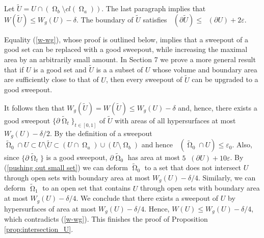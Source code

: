 \documentclass[12pt]{amsart}
\DeclareMathOperator{\Hn}{\mathcal{H}^n}
\DeclareMathOperator{\Hnn}{\mathcal{H}^{n+1}}
\DeclareMathOperator{\Om}{\Omega}
\newcommand{\Cgs}{5 \Hn(\partial U)}
\theoremstyle{definition}
\begin{document}
Let $\tilde{U}= U \cap (\Om_b \setminus cl(\Om_a))$.
The last paragraph implies that
$W(\tilde{U}) \leq W_g(U) - \delta$.
The boundary of $\tilde{U}$ satisfies
$\Hn( \partial \tilde{U}) \leq \Hn( \partial U) + 2 \varepsilon$.

Equality (\ref*{w-wg}), whose proof is outlined below,
implies that a sweepout
of a good set can be replaced with a good sweepout,
while increasing the maximal area by an arbitrarily small amount.
In Section 7 we prove a more general result that 
if $U$ is a good set and $\tilde{U}$ is a
a subset of $U$ whose volume and boundary area are
sufficiently close to that of $U$, then every sweepout
of $\tilde{U}$ can be upgraded to a good sweepout.



It follows then that
$W_g(\tilde{U}) = W(\tilde{U}) \leq W_g(U) - \delta$
and, hence, there exists a good sweepout 
$\{\partial \tilde{\Om}_t \}_{t \in [0,1]}$ of $\tilde{U}$
with areas of all hypersurfaces at most $W_g(U) - \delta/2$.
By the definition of a sweepout 
$\tilde{\Om}_0 \cap U \subset U \setminus 
\tilde{U} \subset (U \cap \Om_a ) \cup (U \setminus \Om_b)$
and hence $\Hnn(\tilde{\Om}_0 \cap U) \leq \varepsilon_0$.
Also, since $\{\partial \tilde{\Om}_t \}$
is a good sweepout, $\partial \tilde{\Om}_0$ has
area at most $\Cgs + 10 \varepsilon$.
By (\ref*{pushing out small set}) we can deform
$\tilde{\Om}_0$ to a set that does not intersect $U$ 
through open sets with boundary area at most 
$W_g(U) - \delta/4$.
Similarly, we can deform $\tilde{\Om}_1$
to an open set that contains $U$
through open sets with boundary area at most 
$W_g(U) - \delta/4$.
We conclude that there exists a sweepout of $U$
by hypersurfaces of area at most 
$W_g(U) - \delta/4$. Hence, $W(U) \leq W_g(U) - \delta/4$,
which contradicts (\ref*{w-wg}). This finishes the proof
of Proposition \ref*{prop:intersection_U}.
\end{document}
